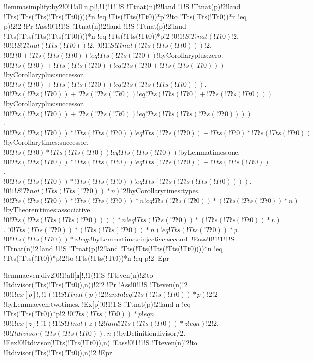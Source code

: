 !lemma{simplify:by2}{!0!1!all[n,p]!,!1(!1!1!S !Tt{nat}(n)!2!land !1!S !Tt{nat}(p)!2!land !Tt{s}(!Tt{s}(!Tt{s}(!Tt{s}(!Tt{0}))))*n !eq !Tt{s}(!Tt{s}(!Tt{0}))*p!2!to !Tt{s}(!Tt{s}(!Tt{0}))*n !eq p)!2!2}
!Pr{
!Ass{!0!1!1!S !Tt{nat}(n)!2!land !1!S !Tt{nat}(p)!2!land !Tt{s}(!Tt{s}(!Tt{s}(!Tt{s}(!Tt{0}))))*n !eq !Tt{s}(!Tt{s}(!Tt{0}))*p!2}
$!0!1!S !Tt{nat}(!Tt{0})!2$.
$!0!1!S !Tt{nat}(!Tt{s}(!Tt{0}))!2$.
$!0!1!S !Tt{nat}(!Tt{s}(!Tt{s}(!Tt{0})))!2$.
$!0!Tt{0}+!Tt{s}(!Tt{s}(!Tt{0})) !eq !Tt{s}(!Tt{s}(!Tt{0}))$!by{Corollary}{plus:zero}.
$!0!Tt{s}(!Tt{0})+!Tt{s}(!Tt{s}(!Tt{0})) !eq !Tt{s}(!Tt{0}+!Tt{s}(!Tt{s}(!Tt{0})))$!by{Corollary}{plus:successor}.
$!0!Tt{s}(!Tt{0})+!Tt{s}(!Tt{s}(!Tt{0})) !eq !Tt{s}(!Tt{s}(!Tt{s}(!Tt{0})))$.
$!0!Tt{s}(!Tt{s}(!Tt{0}))+!Tt{s}(!Tt{s}(!Tt{0})) !eq !Tt{s}(!Tt{s}(!Tt{0})+!Tt{s}(!Tt{s}(!Tt{0})))$!by{Corollary}{plus:successor}.
$!0!Tt{s}(!Tt{s}(!Tt{0}))+!Tt{s}(!Tt{s}(!Tt{0})) !eq !Tt{s}(!Tt{s}(!Tt{s}(!Tt{s}(!Tt{0}))))$.
$!0!Tt{s}(!Tt{s}(!Tt{0}))*!Tt{s}(!Tt{s}(!Tt{0})) !eq !Tt{s}(!Tt{s}(!Tt{0}))+!Tt{s}(!Tt{0})*!Tt{s}(!Tt{s}(!Tt{0}))$!by{Corollary}{times:successor}.
$!0!Tt{s}(!Tt{0})*!Tt{s}(!Tt{s}(!Tt{0})) !eq !Tt{s}(!Tt{s}(!Tt{0}))$!by{Lemma}{times:one}.
$!0!Tt{s}(!Tt{s}(!Tt{0}))*!Tt{s}(!Tt{s}(!Tt{0})) !eq !Tt{s}(!Tt{s}(!Tt{0}))+!Tt{s}(!Tt{s}(!Tt{0}))$.
$!0!Tt{s}(!Tt{s}(!Tt{0}))*!Tt{s}(!Tt{s}(!Tt{0})) !eq !Tt{s}(!Tt{s}(!Tt{s}(!Tt{s}(!Tt{0}))))$.
$!0!1!S !Tt{nat}(!Tt{s}(!Tt{s}(!Tt{0}))*n)!2$!by{Corollary}{times:types}.
$!0!Tt{s}(!Tt{s}(!Tt{0}))*!Tt{s}(!Tt{s}(!Tt{0}))*n !eq !Tt{s}(!Tt{s}(!Tt{0}))*(!Tt{s}(!Tt{s}(!Tt{0}))*n)$!by{Theorem}{times:associative}.
$!0!Tt{s}(!Tt{s}(!Tt{s}(!Tt{s}(!Tt{0}))))*n !eq !Tt{s}(!Tt{s}(!Tt{0}))*(!Tt{s}(!Tt{s}(!Tt{0}))*n)$.
$!0!Tt{s}(!Tt{s}(!Tt{0}))*(!Tt{s}(!Tt{s}(!Tt{0}))*n) !eq !Tt{s}(!Tt{s}(!Tt{0}))*p$.
$!0!Tt{s}(!Tt{s}(!Tt{0}))*n !eq p$!by{Lemma}{times:injective:second}.
!Eass{!0!1!1!1!S !Tt{nat}(n)!2!land !1!S !Tt{nat}(p)!2!land !Tt{s}(!Tt{s}(!Tt{s}(!Tt{s}(!Tt{0}))))*n !eq !Tt{s}(!Tt{s}(!Tt{0}))*p!2!to !Tt{s}(!Tt{s}(!Tt{0}))*n !eq p!2}}
!Epr

!lemma{even:div2}{!0!1!all[n]!,!1(!1!S !Tt{even}(n)!2!to !It{divisor}(!Tt{s}(!Tt{s}(!Tt{0})),n))!2!2}
!Pr{
!Ass{!0!1!S !Tt{even}(n)!2}
$!0!1!ex[p]!,!1(!1!S !Tt{nat}(p)!2!land n !eq !Tt{s}(!Tt{s}(!Tt{0}))*p)!2!2$!by{Lemma}{even:twotimes}.
!Ex[p]{!0!1!1!S !Tt{nat}(p)!2!land n !eq !Tt{s}(!Tt{s}(!Tt{0}))*p!2}
$!0!Tt{s}(!Tt{s}(!Tt{0}))*p !eq n$.
$!0!1!ex[z]!,!1(!1!S !Tt{nat}(z)!2!land !Tt{s}(!Tt{s}(!Tt{0}))*z !eq n)!2!2$.
$!0!It{divisor}(!Tt{s}(!Tt{s}(!Tt{0})),n)$!by{Definition}{divisor/2}.
!Eex{!0!It{divisor}(!Tt{s}(!Tt{s}(!Tt{0})),n)}
!Eass{!0!1!1!S !Tt{even}(n)!2!to !It{divisor}(!Tt{s}(!Tt{s}(!Tt{0})),n)!2}}
!Epr

